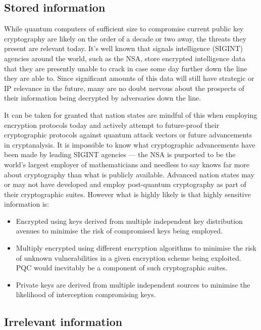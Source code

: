 \subsection{Stored information} \label{stored-information}

While quantum computers of sufficient size to compromise current public key cryptography are likely on the order of a decade or two away, the threats they present are relevant today. It's well known that signals intelligence (SIGINT) agencies around the world, such as the NSA, store encrypted intelligence data that they are presently unable to crack in case some day further down the line they are able to. Since significant amounts of this data will still have strategic or IP relevance in the future, many are no doubt nervous about the prospects of their information being decrypted by adversaries down the line.

It can be taken for granted that nation states are mindful of this when employing encryption protocols today and actively attempt to future-proof their cryptographic protocols against quantum attack vectors or future advancements in cryptanalysis. It is impossible to know what cryptographic advancements have been made by leading SIGINT agencies --- the NSA is purported to be the world's largest employer of mathematicians and needless to say knows far more about cryptography than what is publicly available. Advanced nation states may or may not have developed and employ post-quantum cryptography as part of their cryptographic suites. However what is highly likely is that highly sensitive information is:
\begin{itemize}
	\item Encrypted using keys derived from multiple independent key distribution avenues to minimise the risk of compromised keys being employed.
	\item Multiply encrypted using different encryption algorithms to minimise the risk of unknown vulnerabilities in a given encryption scheme being exploited. PQC would inevitably be a component of such cryptographic suites.
	\item Private keys are derived from multiple independent sources to minimise the likelihood of interception compromising keys.
\end{itemize}

\subsection{Irrelevant information}

